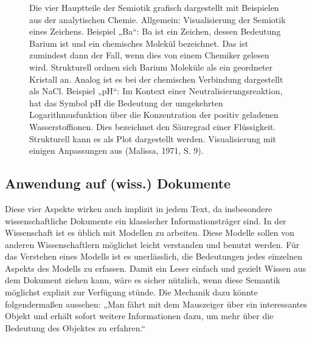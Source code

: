  
\begin{figure}[h!]
\centering
\advance\leftskip-2.5cm
\caption[Semiotik grafisch dargestellt]{ Die vier Hauptteile der Semiotik grafisch dargestellt mit Beispielen aus der analytischen Chemie. Allgemein: Visualisierung der Semiotik eines Zeichens. Beispiel „Ba“: Ba ist ein Zeichen, dessen Bedeutung Barium ist und ein chemisches Molekül bezeichnet. Das ist zumindest dann der Fall, wenn dies von einem Chemiker gelesen wird. Strukturell ordnen sich Barium Moleküle als ein geordneter Kristall an. Analog ist es bei der chemischen Verbindung dargestellt als NaCl. Beispiel „pH“: Im Kontext einer Neutralisierungsreaktion, hat das Symbol pH die Bedeutung der umgekehrten Logarithmusfunktion über die Konzentration der positiv geladenen Wasserstoffionen. Dies bezeichnet den Säuregrad einer Flüssigkeit. Strukturell kann es als Plot dargestellt werden. Visualisierung mit einigen Anpassungen aus (Malissa, 1971, S. 9). }\label{semiotik}
\end{figure}
 
\subsection{Anwendung auf (wiss.) Dokumente}\label{}
 
Diese vier Aspekte wirken auch implizit in jedem Text, da insbesondere wissenschaftliche Dokumente ein klassischer Informationsträger sind. In der Wissenschaft ist es üblich mit Modellen zu arbeiten. Diese Modelle sollen von anderen Wissenschaftlern möglichst leicht verstanden und benutzt werden. Für das Verstehen eines Modells ist es unerlässlich, die Bedeutungen jedes einzelnen Aspekts des Modells zu erfassen. Damit ein Leser einfach und gezielt Wissen aus dem Dokument ziehen kann, wäre es sicher nützlich, wenn diese Semantik möglichst explizit zur Verfügung stünde. Die Mechanik dazu könnte folgendermaßen aussehen: „Man fährt mit dem Mauszeiger über ein interessantes Objekt und erhält sofort weitere Informationen dazu, um mehr über die Bedeutung des Objektes zu erfahren.“

